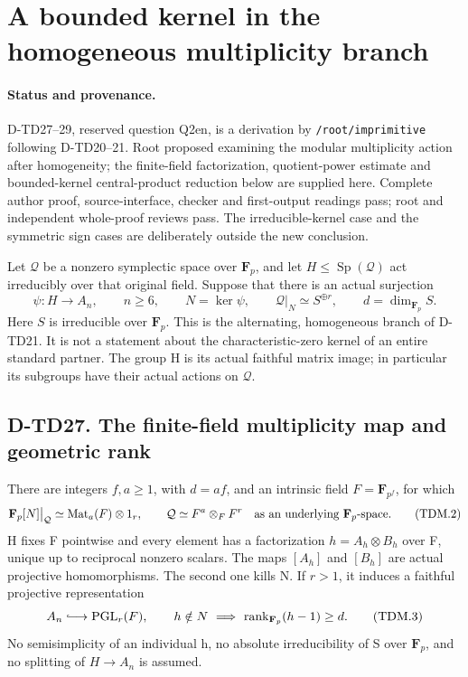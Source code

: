 \section{A bounded kernel in the homogeneous multiplicity branch}
\label{sec:heisenberg-homogeneous-multiplicity}

\paragraph{Status and provenance.}
D-TD27--29, reserved question Q2en, is a derivation by
\texttt{/root/imprimitive} following D-TD20--21.  Root proposed
examining the modular multiplicity action after homogeneity; the
finite-field factorization, quotient-power estimate and bounded-kernel
central-product reduction below are supplied here.  Complete author
proof, source-interface, checker and first-output readings pass;
root and independent whole-proof reviews pass.  The irreducible-kernel case and the symmetric
sign cases are deliberately outside the new conclusion.

Let \(\mathcal Q\) be a nonzero symplectic space over \(\mathbf F_p\),
and let \(H\le\operatorname{Sp}(\mathcal Q)\) act irreducibly over
that original field.  Suppose that there is an actual surjection
\[
 \psi:H\longrightarrow A_n,\qquad n\ge6,\qquad
 N=\ker\psi,\qquad
 \mathcal Q\big|_N\simeq S^{\oplus r},
 \qquad d=\dim_{\mathbf F_p}S.
 \tag{TDM.1}
\]
Here \(S\) is irreducible over \(\mathbf F_p\).  This is the
alternating, homogeneous branch of D-TD21.  It is not a statement
about the characteristic-zero kernel of an entire standard partner.
The group H is its actual faithful matrix image; in particular its
subgroups have their actual actions on \(\mathcal Q\).

\subsection*{D-TD27. The finite-field multiplicity map and geometric rank}

\begin{lemma}[D-TD27]
There are integers \(f,a\ge1\), with \(d=af\), and an intrinsic
field \(F=\mathbf F_{p^f}\), for which
\[
 \mathbf F_p[N]\big|_{\mathcal Q}
       \simeq\operatorname{Mat}_a(F)\otimes1_r,
 \qquad
 \mathcal Q\simeq F^a\otimes_F F^r
       \quad\hbox{as an underlying }\mathbf F_p\hbox{-space}.
 \tag{TDM.2}
\]
H fixes F pointwise and every element has a factorization
\(h=A_h\otimes B_h\) over F, unique up to reciprocal nonzero
scalars.  The maps \([A_h]\) and \([B_h]\) are actual projective
homomorphisms.  The second one kills N.  If \(r>1\), it induces
a faithful projective representation
\[
           A_n\lhook\joinrel\longrightarrow\operatorname{PGL}_r(F),
 \qquad
 h\notin N\ \Longrightarrow\
          \operatorname{rank}_{\mathbf F_p}(h-1)\ge d.
 \tag{TDM.3}
\]
No semisimplicity of an individual h, no absolute irreducibility of
S over \(\mathbf F_p\), and no splitting of \(H\to A_n\) is assumed.
\end{lemma}

